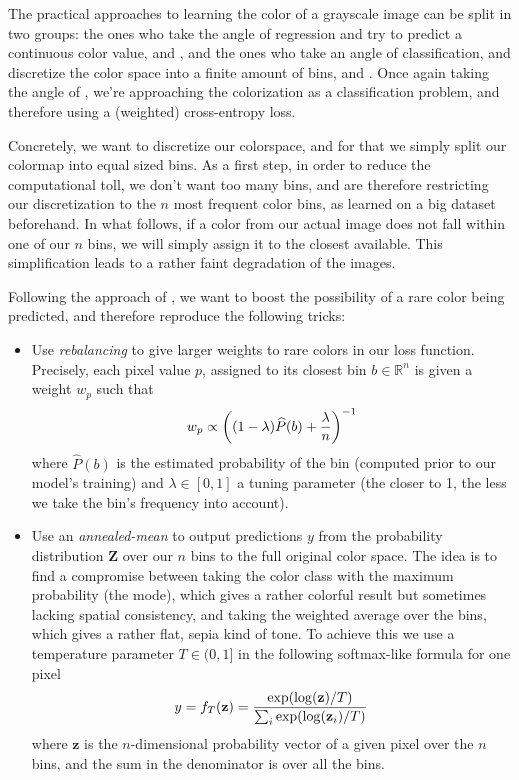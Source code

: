 \documentclass[10pt,twocolumn,letterpaper]{article}
\begin{document}

The practical approaches to learning the color of a grayscale image can be split in two groups: the ones who take the angle of regression and try to predict a continuous color value, \eg \cite{cheng2015deep} and \cite{dahl2016tinyclouds}, and the ones who take an angle of classification, and discretize the color space into a finite amount of bins, \eg \cite{charpiat2008automatic} and \cite{zhang2016colorful}. Once again taking the angle of \cite{zhang2016colorful}, we're approaching the colorization as a classification problem, and therefore using a (weighted) cross-entropy loss.

Concretely, we want to discretize our colorspace, and for that we simply split our colormap into equal sized bins. As a first step, in order to reduce the computational toll, we don't want too many bins, and are therefore restricting our discretization to the $n$ most frequent color bins, as learned on a big dataset beforehand. In what follows, if a color from our actual image does not fall within one of our $n$ bins, we will simply assign it to the closest available. This simplification leads to a rather faint degradation of the images.

Following the approach of \cite{zhang2016colorful}, we want to boost the possibility of a rare color being predicted, and therefore reproduce the following tricks:
\begin{itemize}
\item Use \textit{rebalancing} to give larger weights to rare colors in our loss function. Precisely, each pixel value $p$, assigned to its closest bin $b \in \mathbb{R}^n$ is given a weight $w_p$ such that $$w_p \propto \left( (1-\lambda) \widehat{P}(b) + {\lambda \over n} \right)^{-1}$$ where $\widehat{P}(b)$ is the estimated probability of the bin (computed prior to our model's training) and $\lambda \in [0,1]$ a tuning parameter (the closer to 1, the less we take the bin's frequency into account).
\item Use an \textit{annealed-mean} to output predictions $y$ from the probability distribution $\textbf{Z}$ over our $n$ bins to the full original color space. The idea is to find a compromise between taking the color class with the maximum probability (the mode), which gives a rather colorful result but sometimes lacking spatial consistency, and taking the weighted average over the bins, which gives a rather flat, sepia kind of tone. To achieve this we use a temperature parameter $T \in (0,1]$ in the following softmax-like formula for one pixel $$y = f_T(\textbf{z}) = {\exp(\log(\textbf{z}) / T) \over \sum_i \exp(\log(\textbf{z}_i) / T)}$$ where $\textbf{z}$ is the $n$-dimensional probability vector of a given pixel over the $n$ bins, and the sum in the denominator is over all the bins.
\end{itemize}
\end{document}
